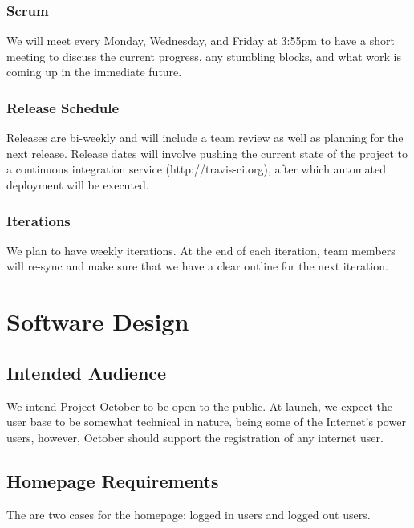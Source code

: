 \documentclass[11pt,letterpaper]{article}
\begin{document}
\subsubsection{Scrum}
We will meet every Monday, Wednesday, and Friday at 3:55pm to have a short meeting to discuss the current progress, any stumbling blocks, and what work is coming up in the immediate future.

\subsubsection{Release Schedule}
Releases are bi-weekly and will include a team review as well as planning for the next release.
Release dates will involve pushing the current state of the project to a continuous integration service (http://travis-ci.org), after which automated deployment will be executed.

\subsubsection{Iterations}
We plan to have weekly iterations.
At the end of each iteration, team members will re-sync and make sure that we have a clear outline for the next iteration.

\section{Software Design}

\subsection{Intended Audience}
We intend Project October to be open to the public.
At launch, we expect the user base to be somewhat technical in nature, being some of the Internet's power users, however, October should support the registration of any internet user.

\subsection{Homepage Requirements}
The are two cases for the homepage: logged in users and logged out users.
\end{document}
